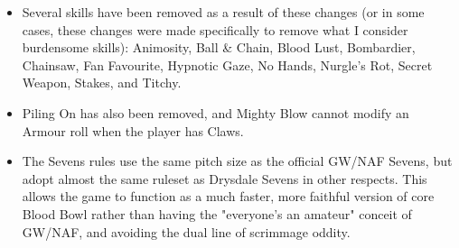 \documentclass{article}
\begin{document}
\begin{multicols}{2}
\begin{itemize}
\item Several skills have been removed as a result of these changes (or in some cases, these changes were made specifically to remove what I consider burdensome skills): Animosity, Ball \& Chain, Blood Lust, Bombardier, Chainsaw, Fan Favourite, Hypnotic Gaze, No Hands, Nurgle's Rot, Secret Weapon, Stakes, and Titchy.
\item Piling On has also been removed, and Mighty Blow cannot modify an Armour roll when the player has Claws.
\item The Sevens rules use the same pitch size as the official GW/NAF Sevens, but adopt almost the same ruleset as Drysdale Sevens in other respects. This allows the game to function as a much faster, more faithful version of core Blood Bowl rather than having the "everyone's an amateur" conceit of GW/NAF, and avoiding the dual line of scrimmage oddity.
\end{itemize}

\end{multicols}
\end{document}
